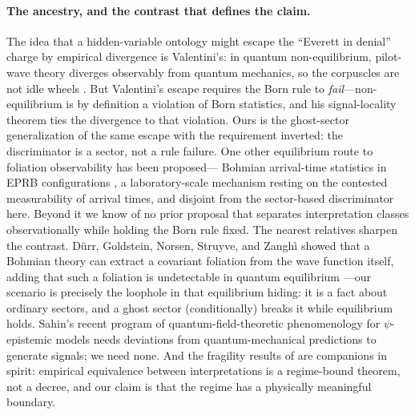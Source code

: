 \documentclass[11pt]{article}
\theoremstyle{remark}
\begin{document}
\paragraph{The ancestry, and the contrast that defines the claim.}
The idea that a hidden-variable ontology might escape the
``Everett in denial'' charge by empirical divergence is Valentini's:
in quantum non-equilibrium, pilot-wave theory diverges observably
from quantum mechanics, so the corpuscles are not idle wheels
\cite{Valentini0811,Valentini1991a,Valentini2002}. But Valentini's
escape requires the Born rule to \emph{fail}---non-equilibrium is by
definition a violation of Born statistics, and his signal-locality
theorem ties the divergence to that violation. Ours is the
ghost-sector generalization of the same escape with the requirement
inverted: the discriminator is a sector, not a rule failure. One other
equilibrium route to foliation observability has been proposed---%
Bohmian arrival-time statistics in EPRB configurations
\cite{AmblardDrezet}, a laboratory-scale mechanism resting on the
contested measurability of arrival times, and disjoint from the
sector-based discriminator here. Beyond it we know of no prior proposal
that separates interpretation classes observationally while holding the
Born rule fixed. The nearest
relatives sharpen the contrast. D\"urr, Goldstein, Norsen, Struyve,
and Zangh\`i showed that a Bohmian theory can extract a covariant
foliation from the wave function itself, adding that such a foliation
is undetectable in quantum equilibrium \cite{DGNSZ}---our scenario is
precisely the loophole in that equilibrium hiding: it is a fact about
ordinary sectors, and a ghost sector
(conditionally) breaks it while equilibrium holds. Sahin's recent
program of quantum-field-theoretic phenomenology for
$\psi$-epistemic models \cite{Sahin2026} needs deviations from
quantum-mechanical predictions to generate signals; we need none.
And the fragility results of \cite{MMO2025} are companions in spirit:
empirical equivalence between interpretations is a regime-bound
theorem, not a decree, and our claim is that the regime has a
physically meaningful boundary.
\end{document}
